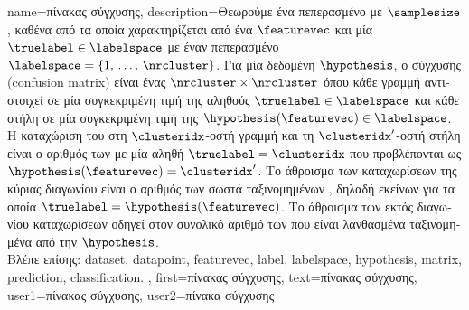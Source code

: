 {name={\foreignlanguage{greek}{πίνακας σύγχυσης}}, 
	description={\foreignlanguage{greek}{Θεωρούμε ένα πεπερασμένο} 
		 \foreignlanguage{greek}{με} $\samplesize$ ,  
		\foreignlanguage{greek}{καθένα από τα οποία χαρακτηρίζεται από ένα}  $\featurevec$ 
		\foreignlanguage{greek}{και μία}  $\truelabel \in \labelspace$ \foreignlanguage{greek}{με έναν πεπερασμένο}
		 $\labelspace = \{1, \,\ldots, \,\nrcluster\}$. \foreignlanguage{greek}{Για μία δεδομένη} 
		 $\hypothesis$, \foreignlanguage{greek}{ο}  \foreignlanguage{greek}{σύγχυσης} 
		(confusion matrix) \foreignlanguage{greek}{είναι ένας $\nrcluster \times \nrcluster$}  
		\foreignlanguage{greek}{όπου κάθε γραμμή αντιστοιχεί σε μία συγκεκριμένη τιμή της αληθούς}  
		$\truelabel \in \labelspace$ \foreignlanguage{greek}{και κάθε στήλη σε μία συγκεκριμένη τιμή της}  
		$\hypothesis(\featurevec) \in \labelspace$. \foreignlanguage{greek}{Η καταχώριση του}  
		\foreignlanguage{greek}{στη $\clusteridx$-οστή γραμμή και τη $\clusteridx'$-οστή στήλη είναι ο αριθμός των}  
		\foreignlanguage{greek}{με μία αληθή}  $\truelabel = \clusteridx$ \foreignlanguage{greek}{που προβλέπονται 
		ως $\hypothesis(\featurevec) = \clusteridx'$. Το άθροισμα των καταχωρίσεων της κύριας διαγωνίου είναι ο αριθμός των σωστά
		ταξινομημένων} , \foreignlanguage{greek}{δηλαδή εκείνων για τα οποία 
		$\truelabel = \hypothesis(\featurevec)$. Το άθροισμα των εκτός διαγωνίου καταχωρίσεων οδηγεί στον συνολικό αριθμό των}
		 \foreignlanguage{greek}{που είναι λανθασμένα ταξινομημένα από την} $\hypothesis$.
		\\
		\foreignlanguage{greek}{Βλέπε επίσης:} \gls{dataset}, \gls{datapoint}, \gls{featurevec}, \gls{label}, \gls{labelspace}, \gls{hypothesis}, 
		\gls{matrix}, \gls{prediction}, \gls{classification}. },
	first={\foreignlanguage{greek}{πίνακας σύγχυσης}},
	text={\foreignlanguage{greek}{πίνακας σύγχυσης}},
	user1={\foreignlanguage{greek}{πίνακας σύγχυσης}}, %
	user2={\foreignlanguage{greek}{πίνακα σύγχυσης}} %
}

